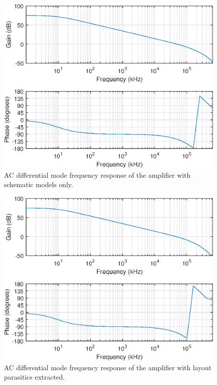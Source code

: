 \documentclass[journal,hidelinks]{IEEEtran}
\begin{document}
\begin{figure}[!htb]
  \centering
  \includegraphics[width=\columnwidth]{figures/schematic/ac_dm.eps}
  \caption{AC differential mode frequency response of the amplifier with schematic models only.}
  \label{fig:sch_ac_dm}
\end{figure}

\begin{figure}[!htb]
  \centering
  \includegraphics[width=\columnwidth]{figures/layout/ac_dm.eps}
  \caption{AC differential mode frequency response of the amplifier with layout parasitics extracted.}
  \label{fig:lay_ac_dm}
\end{figure}
\end{document}
